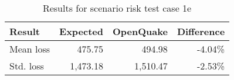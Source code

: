 \begin{table}[htbp]

\centering
\begin{tabular}{ l r r r }

\hline
\rowcolor{anti-flashwhite}
\bf{Result} & \bf{Expected} & \bf{OpenQuake} & \bf{Difference}\\
\hline
Mean loss & 475.75 & 494.98 & -4.04\% \\
Std. loss & 1,473.18 & 1,510.47 & -2.53\% \\
\hline
\end{tabular}

\caption{Results for scenario risk test case 1e}
\label{tab:result-sr-1e}
\end{table}
